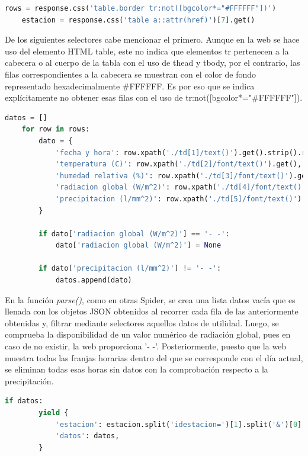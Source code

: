 \begin{lstlisting}[language=Python, caption={Selector en \textit{parse()} de MeteoNavarra Data Spider}]
	rows = response.css('table.border tr:not([bgcolor*="#FFFFFF"])')
	estacion = response.css('table a::attr(href)')[7].get()
\end{lstlisting}

De los siguientes selectores cabe mencionar el primero. Aunque en la web se hace uso del elemento HTML table, este no indica que elementos tr pertenecen a la cabecera o al cuerpo de la tabla con el uso de thead y tbody, por el contrario, las filas correspondientes a la cabecera se muestran con el color de fondo representado hexadecimalmente \#FFFFFF. Es por eso que se indica explícitamente no obtener esas filas con el uso de tr:not([bgcolor*="\#FFFFFF"]).

\begin{lstlisting}[language=Python, caption={Trabajar sobre los datos de MeteoNavarra Data Spider}]
	datos = []
	for row in rows:
		dato = {
			'fecha y hora': row.xpath('./td[1]/text()').get().strip().replace(' ', ' ') + ':00',
			'temperatura (C)': row.xpath('./td[2]/font/text()').get(),
			'humedad relativa (%)': row.xpath('./td[3]/font/text()').get(),
			'radiacion global (W/m^2)': row.xpath('./td[4]/font/text()').get(),
			'precipitacion (l/mm^2)': row.xpath('./td[5]/font/text()').get(),
		}
		
		if dato['radiacion global (W/m^2)'] == '- -':
			dato['radiacion global (W/m^2)'] = None
		
		if dato['precipitacion (l/mm^2)'] != '- -':
			datos.append(dato)
\end{lstlisting}

En la función \textit{parse()}, como en otras Spider, se crea una lista datos vacía que es llenada con los objetos JSON obtenidos al recorrer cada fila de las anteriormente obtenidas y, filtrar mediante selectores aquellos datos de utilidad.\newline
\newline
Luego, se comprueba la disponibilidad de un valor numérico de radiación global, pues en caso de no existir, la web proporciona '- -'. Posteriormente, puesto que la web muestra todas las franjas horarias dentro del que se corresponde con el día actual, se eliminan todas esas horas sin datos con la comprobación respecto a la precipitación.\newline
\newline

\begin{lstlisting}[language=Python, caption={Comprobacion exitencia de datos y guardado de MeteoNavarra Data Spider}]
	if datos:
		yield {
			'estacion': estacion.split('idestacion=')[1].split('&')[0],
			'datos': datos,
		}
\end{lstlisting}

